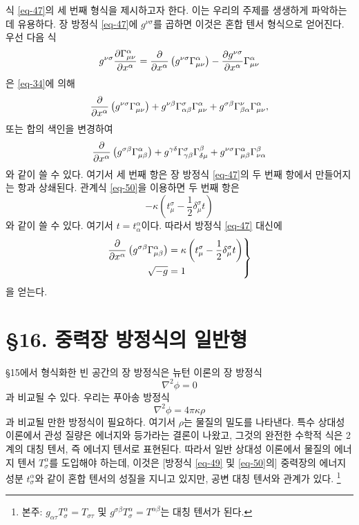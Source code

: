 식 \eqref{eq-47}의 세 번째 형식을 제시하고자 한다. 이는 우리의 주제를 생생하게 파악하는 데 유용하다. 장 방정식 \eqref{eq-47}에 $g^{\nu\sigma}$를 곱하면 이것은 혼합 텐서 형식으로 얻어진다. 우선 다음 식
\begin{equation*}
	g^{\nu\sigma} {\frac{{\partial}{\Gamma_{\mu\nu}^{\alpha}}}{{\partial}{x^\alpha}}}
	= {\frac{{\partial}{}}{{\partial}{x^\alpha}}} \left( g^{\nu\sigma} \Gamma_{\mu\nu}^{\alpha} \right)
	- {\frac{{\partial}{g^{\nu\sigma}}}{{\partial}{x^\alpha}}} \Gamma_{\mu\nu}^{\alpha}
\end{equation*}
은 \eqref{eq-34}에 의해
\begin{equation*}
	{\frac{{\partial}{}}{{\partial}{x^\alpha}}} \left( g^{\nu\sigma} \Gamma_{\mu\nu}^{\alpha} \right)
	+ g^{\nu\beta} \Gamma_{\alpha\beta}^{\sigma} \Gamma_{\mu\nu}^{\alpha}
	+ g^{\sigma\beta} \Gamma_{\beta\alpha}^{\nu} \Gamma_{\mu\nu}^{\alpha},
\end{equation*}
또는 합의 색인을 변경하여
\begin{equation*}
	{\frac{{\partial}{}}{{\partial}{x^\alpha}}} \left( g^{\sigma\beta} \Gamma_{\mu\beta}^{\alpha} \right)
	+ g^{\gamma\delta} \Gamma_{\gamma\beta}^{\sigma} \Gamma_{\delta\mu}^{\beta}
	+ g^{\nu\sigma} \Gamma_{\mu\beta}^{\alpha} \Gamma_{\nu\alpha}^{\beta}
\end{equation*}
와 같이 쓸 수 있다. 여기서 세 번째 항은 장 방정식 \eqref{eq-47}의 두 번째 항에서 만들어지는 항과 상쇄된다. 관계식 \eqref{eq-50}을 이용하면 두 번째 항은
\begin{equation*}
	-\kappa\left(t_\mu^\sigma - \frac{1}{2} \delta_\mu^\sigma t\right)
\end{equation*}
와 같이 쓸 수 있다. 여기서 $t=t_\alpha^\alpha$이다. 따라서  방정식 \eqref{eq-47} 대신에
\begin{equation} \label{eq-51}
	\left.
	\begin{aligned}
		{\frac{{\partial}{}}{{\partial}{x^\alpha}}} \left( g^{\sigma\beta} \Gamma_{\mu\beta}^{\alpha} \right)
		&= \kappa\left(t_\mu^\sigma - \frac{1}{2} \delta_\mu^\sigma t\right)\\
		\sqrt{-g} &= 1
	\end{aligned}
	\right\}
\end{equation}
을 얻는다.
\section*{\S 16. 중력장 방정식의 일반형}
\S15에서 형식화한 빈 공간의 장 방정식은 뉴턴 이론의 장 방정식
\begin{equation*}
	\nabla^2\phi=0
\end{equation*}
과 비교될 수 있다. 우리는 푸아송 방정식
\begin{equation*}
	\nabla^2\phi=4\pi\kappa\rho
\end{equation*}
과 비교될 만한 방정식이 필요하다. 여기서 $\rho$는 물질의 밀도를 나타낸다.
특수 상대성 이론에서 관성 질량은 에너지와 등가라는 결론이 나왔고, 그것의 완전한 수학적 식은 2계의 대칭 텐서, 즉 에너지 텐서로 표현된다. 따라서 일반 상대성 이론에서 물질의 에너지 텐서 $T_\sigma^\alpha$를 도입해야 하는데, 이것은 [방정식 \eqref{eq-49} 및 \eqref{eq-50}의] 중력장의 에너지 성분 $t_\sigma^\alpha$와 같이 혼합 텐서의 성질을 지니고 있지만, 공변 대칭 텐서와 관계가 있다. \footnote{본주: $g_{\alpha\tau}T_\sigma^\alpha=T_{\sigma\tau}$ 및 $g^{\sigma\beta}T_\sigma^\alpha=T^{\alpha\beta}$는 대칭 텐서가 된다.}

